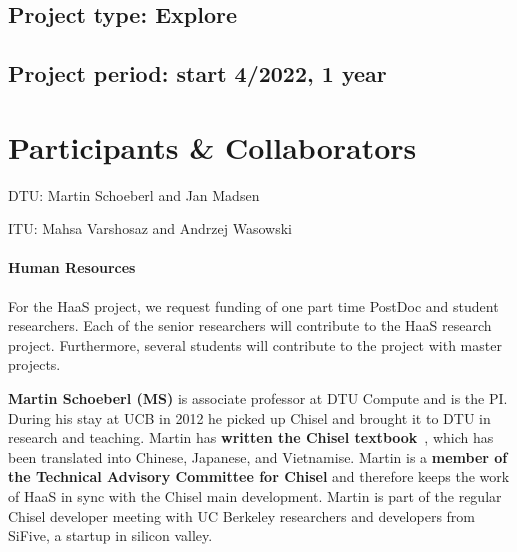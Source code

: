 \documentclass[fleqn,12pt]{article}
\begin{document}
\subsection*{Project type: Explore}

\subsection*{Project period: start 4/2022, 1 year}

\section*{Participants \& Collaborators}

\noindent DTU: Martin Schoeberl and Jan Madsen

\noindent ITU: Mahsa Varshosaz and Andrzej Wasowski

\paragraph*{Human Resources}

For the HaaS project, we request funding of one part time PostDoc and student researchers.
Each of the senior researchers will contribute to the HaaS research project.
Furthermore, several students will contribute to the project with
master projects.
%
%


{\bf Martin Schoeberl (MS)} is associate professor at DTU Compute and is the PI.
During his stay
at UCB in 2012 he picked up Chisel and brought it to DTU in research and teaching.
Martin has {\bf written the Chisel textbook}~\cite{chisel:book}, which has been translated
into Chinese, Japanese, and Vietnamise. Martin is a {\bf member of the Technical Advisory Committee for
Chisel} and therefore keeps the work of HaaS in sync with the Chisel main development.
Martin is part of the regular Chisel developer meeting with
UC Berkeley researchers and developers from SiFive, a startup in silicon valley.
\end{document}
